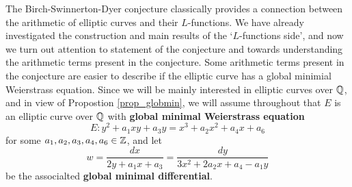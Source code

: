 The Birch-Swinnerton-Dyer conjecture classically provides a connection between the arithmetic of elliptic curves and their $L$-functions. We have already investigated the construction and main results of the `$L$-functions side', and now we turn out attention to statement of the conjecture and towards understanding the arithmetic terms present in the conjecture. Some arithmetic terms present in the conjecture are easier to describe if the elliptic curve has a global minimial Weierstrass equation. Since we will be mainly interested in elliptic curves over $\mathbb{Q}$, and in view of Propostion \ref*{prop_globmin}, we will assume throughout that $E$ is an elliptic curve over $\mathbb{Q}$ with \textbf{global minimal Weierstrass equation}
$$E:y^2+a_1xy+a_3y=x^3+a_2x^2+a_4x+a_6$$ 
for some $a_1,a_2,a_3,a_4,a_6\in\mathbb{Z}$, and let 
$$w=\frac{dx}{2y+a_1x+a_3}=\frac{dy}{3x^2+2a_2x+a_4-a_1y}$$
be the associalted \textbf{global minimal differential}.






